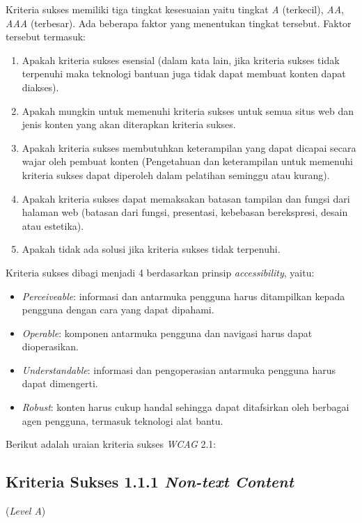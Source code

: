 Kriteria sukses memiliki tiga tingkat kesesuaian yaitu tingkat \textit{A} (terkecil), \textit{AA}, \textit{AAA} (terbesar). Ada beberapa faktor yang menentukan tingkat tersebut. Faktor tersebut termasuk:

\begin{enumerate}
	\item Apakah kriteria sukses esensial (dalam kata lain, jika kriteria sukses tidak terpenuhi maka teknologi bantuan juga tidak dapat membuat konten dapat diakses).
	\item Apakah mungkin untuk memenuhi kriteria sukses untuk semua situs web dan jenis konten yang akan diterapkan kriteria sukses.
	\item Apakah kriteria sukses membutuhkan keterampilan yang dapat dicapai secara wajar oleh pembuat konten (Pengetahuan dan keterampilan untuk memenuhi kriteria sukses dapat diperoleh dalam pelatihan seminggu atau kurang).
	\item Apakah kriteria sukses dapat memaksakan batasan tampilan dan fungsi dari halaman web (batasan dari fungsi, presentasi, kebebasan berekspresi, desain atau estetika).
	\item Apakah tidak ada solusi jika kriteria sukses tidak terpenuhi.
\end{enumerate}

Kriteria sukses dibagi menjadi 4 berdasarkan prinsip \textit{accessibility}, yaitu:
\begin{itemize}
	\item \textit{Perceiveable}: informasi dan antarmuka pengguna harus ditampilkan kepada pengguna dengan cara yang dapat dipahami.
	\item \textit{Operable}: komponen antarmuka pengguna dan navigasi harus dapat dioperasikan.
	\item \textit{Understandable}: informasi dan pengoperasian antarmuka pengguna harus dapat dimengerti.
	\item \textit{Robust}: konten harus cukup handal sehingga dapat ditafsirkan oleh berbagai agen pengguna, termasuk teknologi alat bantu.
\end{itemize}

Berikut adalah uraian kriteria sukses \textit{WCAG} 2.1:

\subsection{Kriteria Sukses 1.1.1 \textit{Non-text Content}}
\label{subsec:kriteria_1.1.1}
(\textit{Level A})\\

